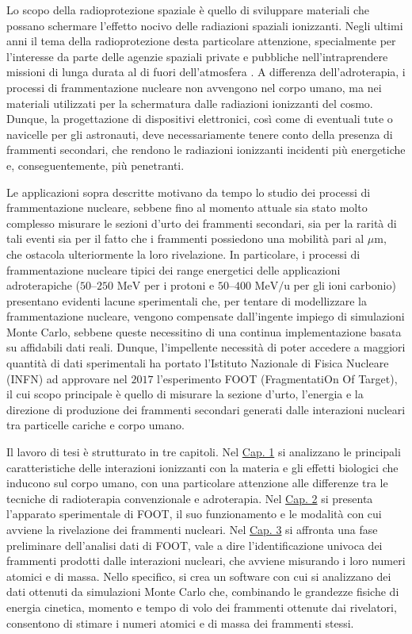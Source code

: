 \documentclass[12pt,a4paper,twoside]{report}
\begin{document}
	Lo scopo della radioprotezione spaziale è quello di sviluppare materiali che possano schermare l'effetto nocivo delle radiazioni spaziali ionizzanti. Negli ultimi anni il tema della radioprotezione desta particolare attenzione, specialmente per l'interesse da parte delle agenzie spaziali private e pubbliche nell'intraprendere missioni di lunga durata al di fuori dell'atmosfera \cite{ubaldiArticle}. A differenza dell'adroterapia, i processi di frammentazione nucleare non avvengono nel corpo umano, ma nei materiali utilizzati per la schermatura dalle radiazioni ionizzanti del cosmo. Dunque, la progettazione di dispositivi elettronici, così come di eventuali tute o navicelle per gli astronauti, deve necessariamente tenere conto della presenza di frammenti secondari, che rendono le radiazioni ionizzanti incidenti più energetiche e, conseguentemente, più penetranti.
	
	Le applicazioni sopra descritte motivano da tempo lo studio dei processi di frammentazione nucleare, sebbene fino al momento attuale sia stato molto complesso misurare le sezioni d'urto dei frammenti secondari, sia per la rarità di tali eventi sia per il fatto che i frammenti possiedono una mobilità pari al $\mu\mbox{m}$, che ostacola ulteriormente la loro rivelazione. In particolare, i processi di frammentazione nucleare tipici dei range energetici delle applicazioni adroterapiche ($50$--$250\mbox{ MeV}$ per i protoni e $50$--$400\mbox{ MeV/u}$ per gli ioni carbonio) presentano evidenti lacune sperimentali che, per tentare di modellizzare la frammentazione nucleare, vengono compensate dall'ingente impiego di simulazioni Monte Carlo, sebbene queste necessitino di una continua implementazione basata su affidabili dati reali. Dunque, l'impellente necessità di poter accedere a maggiori quantità di dati sperimentali ha portato l'Istituto Nazionale di Fisica Nucleare (INFN) ad approvare nel $2017$ l'esperimento FOOT (FragmentatiOn Of Target), il cui scopo principale è quello di misurare la sezione d'urto, l'energia e la direzione di produzione dei frammenti secondari generati dalle interazioni nucleari tra particelle cariche e corpo umano.
	
	Il lavoro di tesi è strutturato in tre capitoli. Nel \hyperref[cap:1]{Cap. 1} si analizzano le principali caratteristiche delle interazioni ionizzanti con la materia e gli effetti biologici che inducono sul corpo umano, con una particolare attenzione alle differenze tra le tecniche di radioterapia convenzionale e adroterapia. Nel \hyperref[cap:2]{Cap. 2} si presenta l'apparato sperimentale di FOOT, il suo funzionamento e le modalità con cui avviene la rivelazione dei frammenti nucleari. Nel \hyperref[cap:3]{Cap. 3} si affronta una fase preliminare dell'analisi dati di FOOT, vale a dire l'identificazione univoca dei frammenti prodotti dalle interazioni nucleari, che avviene misurando i loro numeri atomici e di massa. Nello specifico, si crea un software con cui si analizzano dei dati ottenuti da simulazioni Monte Carlo che, combinando le grandezze fisiche di energia cinetica, momento e tempo di volo dei frammenti ottenute dai rivelatori, consentono di stimare i numeri atomici e di massa dei frammenti stessi.
	\newpage
\end{document}
